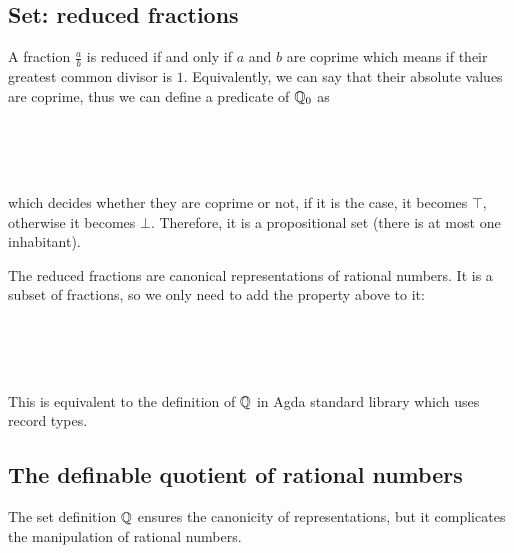 \subsection{Set: reduced fractions}

A fraction $\frac{a}{b}$ is reduced if and only if $a$ and $b$ are coprime which means if their greatest common divisor is $1$. Equivalently, we can say that their absolute values are coprime, thus we can define a predicate of $\mathbb{Q}_0$ as

\begin{code}\>\<%
\\
\> \AgdaSymbol{:}   \<%
\\
\> \AgdaSymbol{(}  \AgdaSymbol{)} \AgdaSymbol{=}  \AgdaSymbol{(}    \AgdaSymbol{(} \AgdaSymbol{))}\<%
\\
\>\<\end{code}

which decides whether they are coprime or not, if it is the case, it becomes $\top$, otherwise it becomes $\bot$. Therefore, it is a propositional set (there is at most one inhabitant).

The reduced fractions are canonical representations of rational
numbers. It is a subset of fractions, so we only need to add the property above to it:

\begin{code}\>\<%
\\
\> \AgdaSymbol{:} \<%
\\
\> \AgdaSymbol{=} \AgdaRecord{Σ[}    \AgdaRecord{]}  \<%
\\
\>\<\end{code}


This is equivalent to the definition of $\mathbb{Q}$ in Agda standard library which uses record types.


\subsection{The definable quotient of rational numbers}

The set definition $\mathbb{Q}$ ensures the canonicity of representations, but it complicates the manipulation
of rational numbers.

